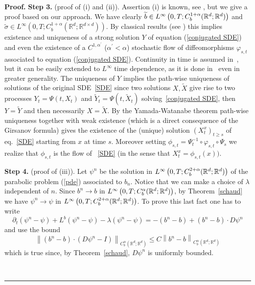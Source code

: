 \documentclass[a4paper,11pt]{article}
\newenvironment{proof}[1][Proof]{\textbf{#1.} }{\ \rule{0.5em}{0.5em}}
\begin{document}
\begin{proof}
\smallskip \textbf{Step 3.} (proof of (i) and (ii)). Assertion (i) is known,
see \cite{V}, but we give a proof based on our approach. We have clearly $%
\widetilde{b}\in L^{\infty }\left( 0,T;C_{b}^{1+\alpha }({\mathbb{R}}^{d};{%
\mathbb{R}}^{d})\right) $ and $\widetilde{\sigma }\in L^{\infty }\left(
0,T;C_{b}^{1+\alpha }({\mathbb{R}}^{d};{\mathbb{R}}^{d\times d})\right) $.
By classical results (see \cite[Ch. 2]{K}) this implies existence and
uniqueness of a strong solution $Y$ of equation (\ref{conjugated SDE}) and
even the existence of a $C^{1,\alpha ^{\prime }}$ ($\alpha ^{\prime }<\alpha
$) stochastic flow of diffeomorphisms $\varphi _{s,t}$ associated to
equation (\ref{conjugated SDE}).
Continuity in time is assumed
in~\cite{K}, but it can be easily extended to $L^\infty$ time dependence, as it is done in~\cite{K2} even in greater generality.
The uniqueness of $Y$ implies the path-wise
uniqueness of solutions of the original SDE~\eqref{SDE} since two solutions $%
X,\tilde{X}$ give rise to two processes $Y_{t}=\Psi (t,X_{t})$ and $\tilde{Y}%
_{t}=\Psi (t,\tilde{X}_{t})$ solving~\eqref{conjugated SDE}, then $Y=\tilde{Y%
}$ and then necessarily $X=\tilde{X}$. By the Yamada-Watanabe theorem
path-wise uniqueness together with weak existence (which is a direct
consequence of the Girsanov formula) gives the existence of the (unique)
solution $(X_{t}^{x})_{t\geq s}$ of eq.~\eqref{SDE} starting from $x$ at
time $s$. Moreover setting $\phi _{s,t}=\Psi _{t}^{-1}\circ \varphi
_{s,t}\circ \Psi _{s}$ we realize that $\phi _{s,t}$ is the flow of~%
\eqref{SDE} (in the sense that $X_{t}^{x}=\phi _{s,t}(x))$.

\smallskip \textbf{Step 4.} (proof of (iii)). Let $\psi ^{n}$ be the
solution in $L^{\infty }\left( 0,T;C_{b}^{2+\alpha }({\mathbb{R}}^{d};{%
\mathbb{R}}^{d})\right) $ of the parabolic problem (\ref{pde}) associated to
$b_{n}$. Notice that we can make a choice of $\lambda $ independent of $n$.
Since $b^{n}\rightarrow b$ in $L^{\infty }\left( 0,T;C_{b}^{\alpha }({%
\mathbb{R}}^{d};{\mathbb{R}}^{d})\right) $, by Theorem~\ref{schaud} we have $%
\psi ^{n}\rightarrow \psi $ in $L^{\infty }\left( 0,T;C_{b}^{2+\alpha }({%
\mathbb{R}}^{d};{\mathbb{R}}^{d})\right) $. To prove this last fact one has to write
\begin{equation*}
\partial _{t}\left( \psi ^{n}-\psi \right) +L^{b}\left( \psi ^{n}-\psi
\right) -\lambda \left( \psi ^{n}-\psi \right) =-\left( b^{n}-b\right)
+\left( b^{n}-b\right) \cdot D\psi ^{n}
\end{equation*}
and use the bound
\begin{equation*}
\left\| \left( b^{n}-b\right) \cdot \left( D\psi ^{n}-I\right) \right\|
_{C_{b}^{\alpha }({\mathbb{R}}^{d};{\mathbb{R}}^{d})}\leq C\left\|
b^{n}-b\right\| _{C_{b}^{\alpha }({\mathbb{R}}^{d};{\mathbb{R}}^{d})}
\end{equation*}
which is true since, by Theorem~\ref{schaud}, $D\psi ^{n}$ is uniformly
bounded.


\end{proof}
\end{document}
